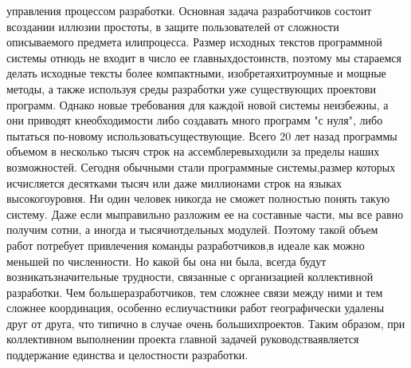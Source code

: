 \documentclass[10pt]{article}
\begin{document}
{ управления процессом разработки.} Основная задача разработчиков состоит в\linebreak  создании иллюзии простоты, в защите пользователей от сложности описываемого предмета или\linebreak  процесса. Размер исходных текстов программной системы отнюдь не входит в число ее главных\linebreak  достоинств, поэтому мы стараемся делать исходные тексты более компактными, изобретая\linebreak  хитроумные и мощные методы, а также используя среды разработки уже существующих проектов\linebreak  и программ. Однако новые требования для каждой новой системы неизбежны, а они приводят к\linebreak  необходимости либо создавать много программ "с нуля", либо пытаться по-новому использовать\linebreak  существующие. Всего 20 лет назад программы объемом в несколько тысяч строк на ассемблере\linebreak  выходили за пределы наших возможностей. Сегодня обычными стали программные системы,\linebreak  размер которых исчисляется десятками тысяч или даже миллионами строк на языках высокого\linebreak  уровня. Ни один человек никогда не сможет полностью понять такую систему. Даже если мы\linebreak  правильно разложим ее на составные части, мы все равно получим сотни, а иногда и тысячи\linebreak  отдельных модулей. Поэтому такой объем работ потребует привлечения команды разработчиков,\linebreak  в идеале как можно меньшей по численности. Но какой бы она ни была, всегда будут возникать\linebreak  значительные трудности, связанные с организацией коллективной разработки. Чем больше\linebreak  разработчиков, тем сложнее связи между ними и тем сложнее координация, особенно если\linebreak  участники работ географически удалены друг от друга, что типично в случае очень больших\linebreak  проектов. Таким образом, при коллективном выполнении проекта главной задачей руководства\linebreak  является поддержание единства и целостности разработки. \linebreak
\end{document}
